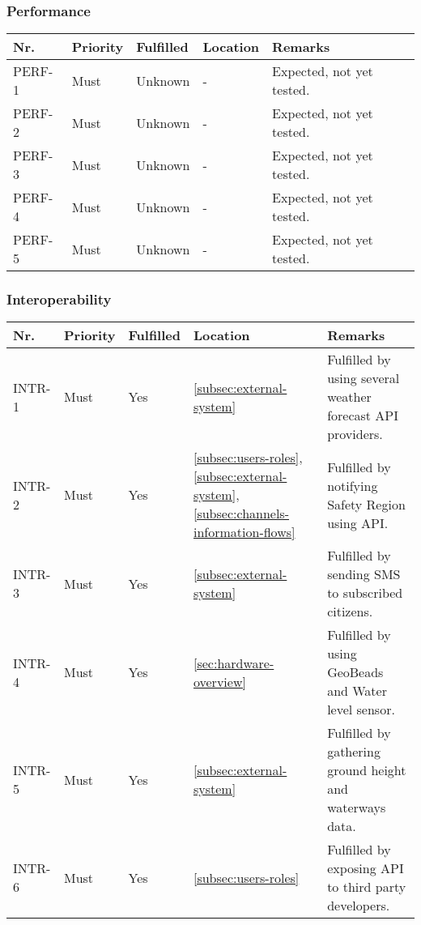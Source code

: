 \subsubsection{Performance}
\begin{table}[H]
	\begin{tabular}{lllll}
						    
		Nr.    & Priority & Fulfilled & Location & Remarks \\ \hline
		PERF-1 & Must     & Unknown  & -         & Expected, not yet tested. \\
		PERF-2 & Must     & Unknown  & -         & Expected, not yet tested. \\
		PERF-3 & Must     & Unknown  & -         & Expected, not yet tested. \\
		PERF-4 & Must     & Unknown  & -         & Expected, not yet tested. \\
		PERF-5 & Must     & Unknown  & -         & Expected, not yet tested. \\
						
	\end{tabular}
\end{table}

\subsubsection{Interoperability}
\begin{table}[H]
	\begin{tabular}{lllll}
						    
		Nr.    & Priority & Fulfilled & Location & Remarks \\ \hline
		INTR-1 & Must     & Yes      &\ref{subsec:external-system} & Fulfilled by using several weather forecast API providers.       \\ 
		INTR-2 & Must     & Yes      &\ref{subsec:users-roles}, \ref{subsec:external-system}, \ref{subsec:channels-information-flows}& Fulfilled by notifying Safety Region using API.\\ 
		INTR-3 & Must     & Yes      &\ref{subsec:external-system} & Fulfilled by sending SMS to subscribed citizens. \\ 
		INTR-4 & Must     & Yes      & \ref{sec:hardware-overview} & Fulfilled by using GeoBeads and Water level sensor. \\ 
		INTR-5 & Must     & Yes      & \ref{subsec:external-system} & Fulfilled by gathering ground height and waterways data. \\ 
		INTR-6 & Must     & Yes      & \ref{subsec:users-roles} & Fulfilled by exposing API to third party developers.       \\ 
						
	\end{tabular}
\end{table}

